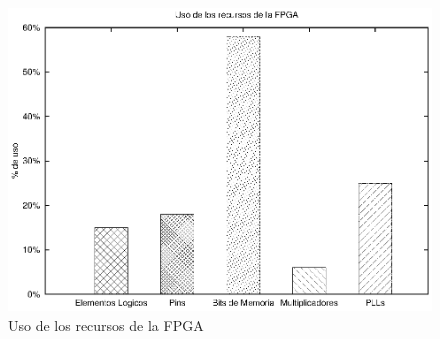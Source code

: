 \begin{figure}[H]
  \centering
	\includegraphics[scale=0.70]{4-implementacion/graf/fpga.eps}
  \caption{Uso de los recursos de la FPGA}
  \label{fig:fpga}
\end{figure}

